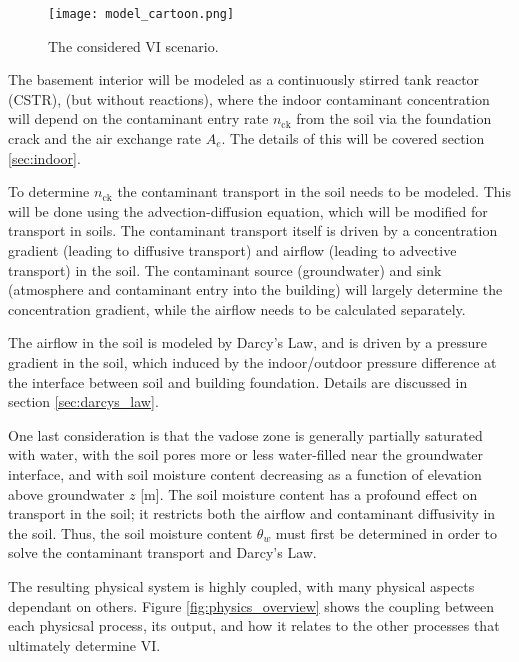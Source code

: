 \begin{figure}[htb!]
  \centering
  \texttt{[image: model\_cartoon.png]}
  \caption{The considered VI scenario.}
  \label{fig:vi_scenario}
\end{figure}

The basement interior will be modeled as a continuously stirred tank reactor (CSTR), (but without reactions), where the indoor contaminant concentration will depend on the contaminant entry rate $n_\mathrm{ck}$ from the soil via the foundation crack and the air exchange rate $A_e$.
The details of this will be covered section \ref{sec:indoor}.\par

To determine $n_\mathrm{ck}$ the contaminant transport in the soil needs to be modeled.
This will be done using the advection-diffusion equation, which will be modified for transport in soils.
The contaminant transport itself is driven by a concentration gradient (leading to diffusive transport) and airflow (leading to advective transport) in the soil.
The contaminant source (groundwater) and sink (atmosphere and contaminant entry into the building) will largely determine the concentration gradient, while the airflow needs to be calculated separately.\par

The airflow in the soil is modeled by Darcy's Law, and is driven by a pressure gradient in the soil, which induced by the indoor/outdoor pressure difference at the interface between soil and building foundation.
Details are discussed in section \ref{sec:darcys_law}.\par

One last consideration is that the vadose zone is generally partially saturated with water, with the soil pores more or less water-filled near the groundwater interface, and with soil moisture content decreasing as a function of elevation above groundwater $z$ [\si{\metre}].
The soil moisture content has a profound effect on transport in the soil; it restricts both the airflow and contaminant diffusivity in the soil.
Thus, the soil moisture content $\theta_w$ must first be determined in order to solve the contaminant transport and Darcy's Law.\par

The resulting physical system is highly coupled, with many physical aspects dependant on others.
Figure \ref{fig:physics_overview} shows the coupling between each physicsal process, its output, and how it relates to the other processes that ultimately determine VI.\par

